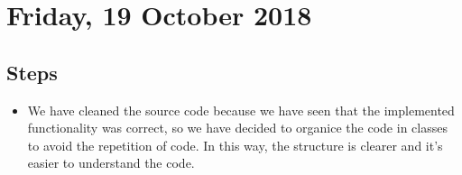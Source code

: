 \section{Friday, 19 October 2018}

\subsection{Steps}
\begin{itemize}
\item We have cleaned the source code because we have seen that the implemented functionality was correct, so we have decided to organice the code in classes  to avoid the repetition of code. In this way, the structure is clearer and it's easier to understand the code.
\end{itemize}